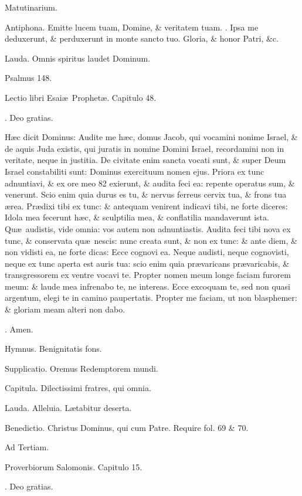 \documentclass[letter,11pt]{book}
\makeatletter
\DeclareRobustCommand{\Vbar}{\vers@resp{-0.1em}{V}}
\DeclareRobustCommand{\Rbar}{\vers@resp{0pt}{R}}
\newcommand{\vers@resp@sym}{\raisebox{0.2ex}{\rotatebox[origin=c]{-20}{$\m@th\rceil$}}}
\newcommand{\vers@resp}[2]{%
  {\ooalign{\hidewidth\kern#1\vers@resp@sym\hidewidth\cr#2\cr}}%
}%
\def\V{\color{Red} \Vbar . \color{black}}
\def\R{\color{Red} \Rbar . \color{black}}
\makeatother
\begin{document}
\begin{multicols*}{2}
Matutinarium.

Antiphona. Emitte lucem tuam, Domine, \& veritatem tuam. \V Ipsa me deduxerunt, \& perduxerunt in monte sancto tuo. Gloria, \& honor Patri, \&c.

Lauda. Omnis spiritus laudet Dominum.

Psalmus 148.

Lectio libri Esai\ae \ Prophet\ae . Capitulo 48.

\R Deo gratias.

H\ae c dicit Dominus: Audite me h\ae c, domus Jacob, qui vocamini nonime Israel, \& de aquis Juda existis, qui juratis in nomine Domini Israel, recordamini non in veritate, neque in justitia. De civitate enim sancta vocati sunt, \& super Deum Israel constabiliti sunt: Dominus exercituum nomen ejus. Priora ex tunc adnuntiavi, \& ex ore meo 82 exierunt, \& audita feci ea: repente operatus sum, \& venerunt. Scio enim quia durus es tu, \& nervus ferreus cervix tua, \& frons tua \ae rea. Pr\ae dixi tibi ex tunc: \& antequam venirent indicavi tibi, ne forte diceres: Idola mea fecerunt h\ae c, \& sculptilia mea, \& conflatilia mandaverunt ista. Qu\ae \ audistis, vide omnia: vos autem non adnuntiastis. Audita feci tibi nova ex tunc, \& conservata qu\ae \ nescis: nunc creata sunt, \& non ex tunc: \& ante diem, \& non vidisti ea, ne forte dicas: Ecce cognovi ea. Neque audisti, neque cognovisti, neque ex tunc aperta est auris tua: scio enim quia pr\ae varicans pr\ae varicabis, \& transgressorem ex ventre vocavi te. Propter nomen meum longe faciam furorem meum: \& laude mea infrenabo te, ne intereas. Ecce excoquam te, sed non quasi argentum, elegi te in camino paupertatis. Propter me faciam, ut non blasphemer: \& gloriam meam alteri non dabo.

\R Amen.

Hymnus. Benignitatis fons.

Supplicatio. Oremus Redemptorem mundi.

Capitula. Dilectissimi fratres, qui omnia.

Lauda. Alleluia. L\ae tabitur deserta.

Benedictio. Christus Dominus, qui cum Patre. Require fol. 69 \& 70.

Ad Tertiam.

Proverbiorum Salomonis. Capitulo 15.

\R Deo gratias.


\end{multicols*}
\end{document}
